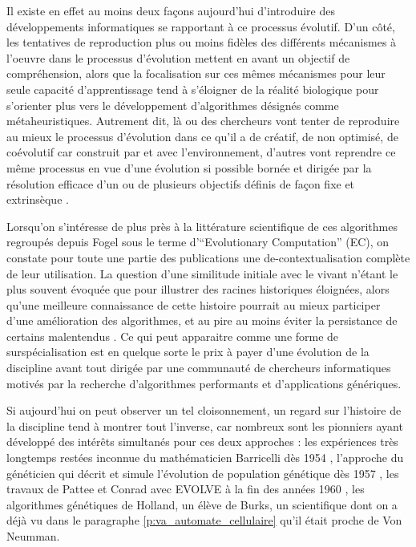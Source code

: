 Il existe en effet au moins deux façons aujourd'hui d'introduire des développements informatiques se rapportant à ce processus évolutif. D'un côté, les tentatives de reproduction plus ou moins fidèles des différents mécanismes à l'oeuvre dans le processus d'évolution mettent en avant un objectif de compréhension, alors que la focalisation sur ces mêmes mécanismes pour leur seule capacité d'apprentissage tend à s'éloigner de la réalité biologique pour s'orienter plus vers le développement d'algorithmes désignés comme métaheuristiques. Autrement dit, là ou des chercheurs vont tenter de reproduire au mieux le processus d'évolution dans ce qu'il a de créatif, de non optimisé, de coévolutif car construit par  et avec l'environnement, d'autres vont reprendre ce même processus en vue d'une évolution si possible bornée et dirigée par la résolution efficace d'un ou de plusieurs objectifs définis de façon fixe et extrinsèque \autocites{Taylor2001, Taylor2012}.

Lorsqu'on s'intéresse de plus près à la littérature scientifique de ces algorithmes regroupés depuis Fogel sous le terme d'\foreignquote{english}{Evolutionary Computation} (EC), on constate pour toute une partie des publications une de-contextualisation complète de leur utilisation. La question d'une similitude initiale avec le vivant n'étant le plus souvent évoquée que pour illustrer des racines historiques éloignées, alors qu'une meilleure connaissance de cette histoire pourrait au mieux participer d'une amélioration des algorithmes, et au pire au moins éviter la persistance de certains malentendus \autocite{DeJong1993a}. Ce qui peut apparaitre comme une forme de surspécialisation est en quelque sorte le prix à payer d'une évolution de la discipline avant tout dirigée par une communauté de chercheurs informatiques motivés par la recherche d'algorithmes performants et d'applications génériques.

Si aujourd'hui on peut observer un tel cloisonnement, un regard sur l'histoire de la discipline tend à montrer tout l'inverse, car nombreux sont les pionniers ayant développé des intérêts simultanés pour ces deux approches : les expériences très longtemps restées inconnue du mathématicien Barricelli dès 1954 , l'approche du généticien \textcite{Fraser1957} qui décrit et simule l'évolution de population génétique dès 1957 , les travaux de Pattee et Conrad avec EVOLVE à la fin des années 1960 \autocite{Conrad1970}, les algorithmes génétiques  de Holland, un élève de Burks, un scientifique dont on a déjà vu dans le paragraphe \ref{p:va_automate_cellulaire} qu'il était proche de Von Neumman.

